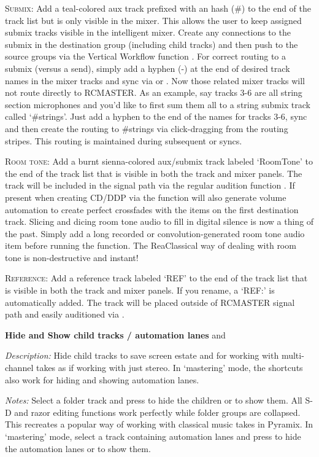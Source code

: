 \documentclass[10pt,american]{article}
\begin{document}
\textsc{Submix}: Add a teal-colored aux track prefixed with an hash (\#) to the
end of the track list but is only visible in the mixer. This allows the user to
keep assigned submix tracks visible in the intelligent mixer. Create any
connections to the submix in the destination group (including child tracks) and
then push to the source groups via the Vertical Workflow function  .
For correct routing to a submix (versus a send), simply add a hyphen (-) at the
end of desired track names in the mixer tracks and sync via  or
. Now those related mixer tracks will not route directly to RCMASTER.
As an example, say tracks 3-6 are all string section microphones and you'd like
to first sum them all to a string submix track called `\#strings'. Just add a
hyphen to the end of the names for tracks 3-6, sync and then create the routing
to \#strings via click-dragging from the routing stripes. This routing is
maintained during subsequent  or  syncs.

\textsc{Room tone}: Add a burnt sienna-colored aux/submix track labeled
`RoomTone' to the end of the track list that is visible in both the track and
mixer panels. The track will be included in the signal path via the regular
audition function . If present when creating CD/DDP via the function
will also generate volume automation to create perfect crossfades with the items
on the first destination track. Slicing and dicing room tone audio to fill in
digital silence is now a thing of the past. Simply add a long recorded or
convolution-generated room tone audio item before running the function. The
ReaClassical way of dealing with room tone is non-destructive and instant! 

\textsc{Reference}: Add a reference track labeled `REF' to the end of the track
list that is visible in both the track and mixer panels. If you rename, a `REF:'
is automatically added. The track will be placed outside of RCMASTER signal path
and easily auditioned via . 

\textbf{Hide and Show child tracks / automation lanes } and

\emph{Description: }Hide child tracks to save screen estate and for working with
multi-channel takes as if working with just stereo. In `mastering' mode, the
shortcuts also work for hiding and showing automation lanes.

\emph{Notes: }Select a folder track and press  to hide the children or
 to show them. All S-D and razor editing functions work perfectly while
folder groups are collapsed. This recreates a popular way of working with
classical music takes in Pyramix. In `mastering' mode, select a track containing
automation lanes and press  to hide the automation lanes or  to
show them.
\end{document}
